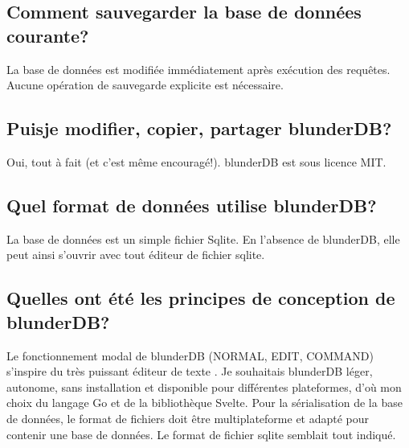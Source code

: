 \documentclass[letterpaper,10pt,french]{sphinxmanual}
\begin{document}
\subsection{Comment sauvegarder la base de données courante?}
\label{\detokenize{faq:comment-sauvegarder-la-base-de-donnees-courante}}
\sphinxAtStartPar
La base de données est modifiée immédiatement après exécution des requêtes.
Aucune opération de sauvegarde explicite est nécessaire.


\subsection{Puis\sphinxhyphen{}je modifier, copier, partager blunderDB?}
\label{\detokenize{faq:puis-je-modifier-copier-partager-blunderdb}}
\sphinxAtStartPar
Oui, tout à fait (et c’est même encouragé!). blunderDB est sous licence MIT.


\subsection{Quel format de données utilise blunderDB?}
\label{\detokenize{faq:quel-format-de-donnees-utilise-blunderdb}}
\sphinxAtStartPar
La base de données est un simple fichier Sqlite. En l’absence de
blunderDB, elle peut ainsi s’ouvrir avec tout éditeur de fichier sqlite.


\subsection{Quelles ont été les principes de conception de blunderDB?}
\label{\detokenize{faq:quelles-ont-ete-les-principes-de-conception-de-blunderdb}}
\sphinxAtStartPar
Le fonctionnement modal de blunderDB (NORMAL, EDIT, COMMAND) s’inspire du très
puissant éditeur de texte . Je souhaitais blunderDB
léger, autonome, sans installation et disponible pour différentes plateformes,
d’où mon choix du langage Go et de la bibliothèque Svelte. Pour la
sérialisation de la base de données, le format de fichiers doit être
multi\sphinxhyphen{}plateforme et adapté pour contenir une base de données. Le format de
fichier sqlite semblait tout indiqué.
\end{document}
